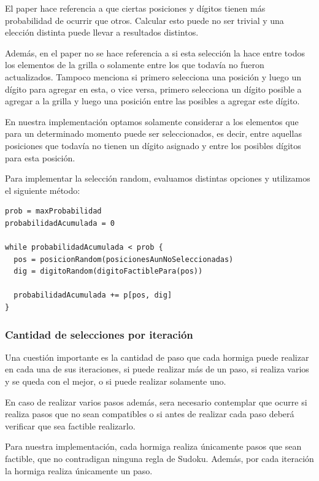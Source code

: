 \documentclass[a4paper,spanish]{article}
\begin{document}
El paper\cite{ant_colony} hace referencia a que ciertas posiciones y dígitos tienen más probabilidad de ocurrir que
otros. Calcular esto puede no ser trivial y una elección distinta puede llevar a resultados distintos.

Además, en el paper no se hace referencia a si esta selección la hace entre todos los elementos de
la grilla o solamente entre los que todavía no fueron actualizados. Tampoco menciona si primero
selecciona una posición y luego un dígito para agregar en esta, o vice versa, primero selecciona un
dígito posible a agregar a la grilla y luego una posición entre las posibles a agregar este dígito.

En nuestra implementación optamos solamente considerar a los elementos que para un determinado
momento puede ser seleccionados, es decir, entre aquellas posiciones que todavía no tienen un dígito
asignado y entre los posibles dígitos para esta posición.

Para implementar la selección random, evaluamos distintas opciones y utilizamos el siguiente método:


\begin{Verbatim}[samepage=true]
prob = maxProbabilidad
probabilidadAcumulada = 0

while probabilidadAcumulada < prob {
  pos = posicionRandom(posicionesAunNoSeleccionadas)
  dig = digitoRandom(digitoFactiblePara(pos))

  probabilidadAcumulada += p[pos, dig]
}
\end{Verbatim}

\subsubsection{Cantidad de selecciones por iteración}

Una cuestión importante es la cantidad de paso que cada hormiga puede realizar en cada una de sus
iteraciones, si puede realizar más de un paso, si realiza varios y se queda con el mejor, o si
puede realizar solamente uno.

En caso de realizar varios pasos además, sera necesario contemplar que ocurre si realiza pasos que
no sean compatibles o si antes de realizar cada paso deberá verificar que sea factible realizarlo.

Para nuestra implementación, cada hormiga realiza únicamente pasos que sean factible, que no
contradigan ninguna regla de Sudoku. Además, por cada iteración la hormiga realiza únicamente un paso.
\end{document}
